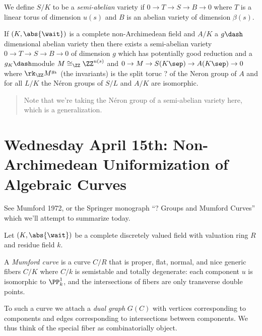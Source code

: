 We define \(S/K\) to be a \emph{semi-abelian} variety if
\(0 \to T \to S \to B \to 0\) where \(T\) is a linear torus of dimension
\(u(s)\) and \(B\) is an abelian variety of dimension \(\beta(s)\).

\begin{description}
\tightlist
\item[Theorem]
If \((K, \abs{\wait})\) is a complete non-Archimedean field and \(A/K\)
a \(g\dash\)dimensional abelian variety then there exists a semi-abelian
variety \(0\to T\to S\to B \to 0\) of dimension \(g\) which has
potentially good reduction and a \(g_K\dash\)module
\(M \cong_\ZZ \ZZ^{u(s)}\) and
\(0 \to M \to S(K\sep) \to A(K\sep) \to 0\) where \(\rk_\ZZ M^{g_k}\)
(the invariants) is the split toruc ? of the Neron group of \(A\) and
for all \(L/K\) the Néron groups of \(S/L\) and \(A/K\) are isomorphic.
\end{description}

\begin{quote}
Note that we're taking the Néron group of a semi-abelian variety here,
which is a generalization.
\end{quote}

\hypertarget{wednesday-april-15th-non-archimedean-uniformization-of-algebraic-curves}{%
\section{Wednesday April 15th: Non-Archimedean Uniformization of
Algebraic
Curves}\label{wednesday-april-15th-non-archimedean-uniformization-of-algebraic-curves}}

See Mumford 1972, or the Springer monograph ``? Groups and Mumford
Curves'' which we'll attempt to summarize today.

Let \((K, \abs{\wait})\) be a complete discretely valued field with
valuation ring \(R\) and residue field \(k\).

\begin{description}
\tightlist
\item[Definition]
A \emph{Mumford curve} is a curve \(C/R\) that is proper, flat, normal,
and nice generic fibers \(C/K\) where \(C/k\) is semistable and totally
degenerate: each component \(u\) is isomorphic to \(\PP^1_k\), and the
intersections of fibers are only transverse double points.
\end{description}

To such a curve we attach a \emph{dual graph} \(G(C)\) with vertices
corresponding to components and edges corresponding to intersections
between components. We thus think of the special fiber as
combinatorially object.

